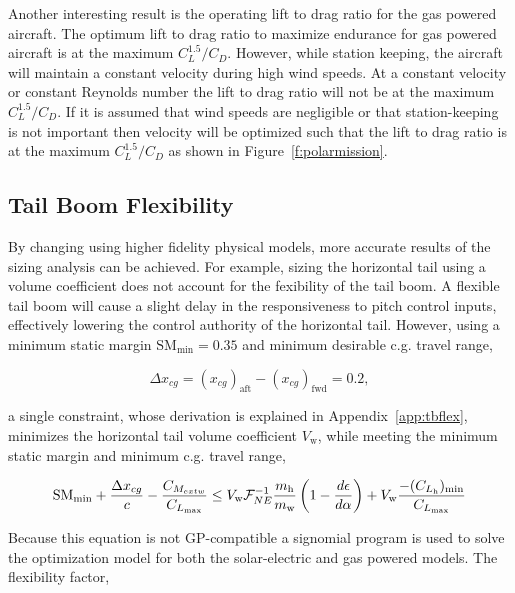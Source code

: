 Another interesting result is the operating lift to drag ratio for the gas powered aircraft.  
The optimum lift to drag ratio to maximize endurance for gas powered aircraft is at the maximum $C_L^{1.5}/C_D$.\cite{br2}  
However, while station keeping, the aircraft will maintain a constant velocity during high wind speeds.  
At a constant velocity or constant Reynolds number the lift to drag ratio will not be at the maximum $C_L^{1.5}/C_D$.  
If it is assumed that wind speeds are negligible or that station-keeping is not important then velocity will be optimized such that the lift to drag ratio is at the maximum $C_L^{1.5}/C_D$ as shown in Figure~\ref{f:polarmission}.


\subsection{Tail Boom Flexibility}

By changing using higher fidelity physical models, more accurate results of the sizing analysis can be achieved.  
For example, sizing the horizontal tail using a volume coefficient does not account for the fexibility of the tail boom. 
A flexible tail boom will cause a slight delay in the responsiveness to pitch control inputs, effectively lowering the control authority of the horizontal tail. 
However, using a minimum static margin $\text{SM}_{\text{min}} = 0.35$ and minimum desirable c.g. travel range,

\begin{equation}
    \label{e:deltacg}
    \Delta x_{cg} = (x_{cg})_{\text{aft}} - (x_{cg})_{\text{fwd}} = 0.2,
\end{equation}

a single constraint, whose derivation is explained in Appendix~\ref{app:tbflex}, minimizes the horizontal tail volume coefficient $V_{\text{w}}$, while meeting the minimum static margin and minimum c.g. travel range,

\begin{equation}
    \label{e:smcorr}
    \text{SM}_{\text{min}} + \frac{\Delta x_{cg}}{c} - \frac{C_{M_{	ext{w}}}}{C_{L_{\text{max}}}} \leq V_{\text{w}} \mathcal{F}_{NE}^{-1} \frac{m_{\text{h}}}{m_{\text{w}}} \left( 1 - \frac{d\epsilon}{d\alpha}\right) + V_{\text{w}} \frac{-(C_{L_{\text{h}}})_{\text{min}}}{C_{L_{\text{max}}}} \\
\end{equation}

Because this equation is not GP-compatible a signomial program is used to solve the optimization model for both the solar-electric and gas powered models.\cite{sp}
The flexibility factor,

